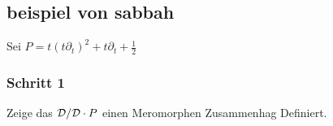 % 

\subsection{beispiel von sabbah}

Sei $P=t(t\partial_t)^2+t\partial_t+\frac{1}{2}$

\subsubsection{Schritt 1} Zeige das $\mathcal{D}/\mathcal{D}\cdot P$ einen Meromorphen
Zusammenhag Definiert.
